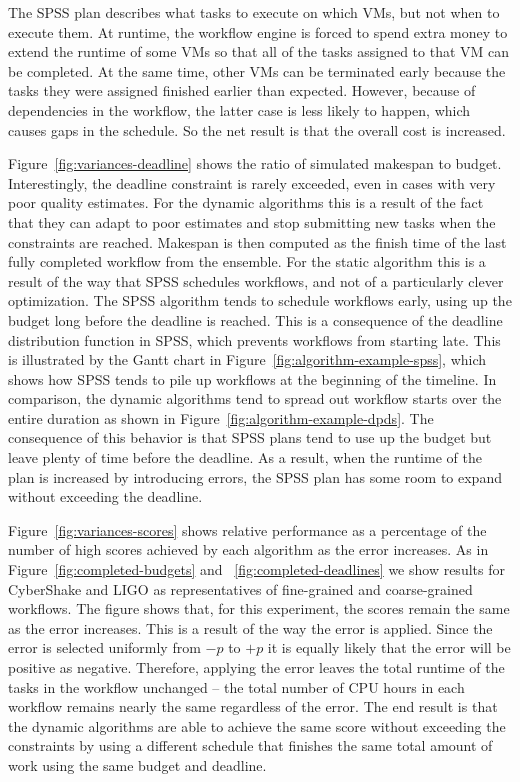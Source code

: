 \documentclass[preprint,5p]{elsarticle}
\begin{document}
The SPSS plan describes what tasks to execute on which VMs, but not when to
execute them. At runtime, the workflow engine is forced to spend extra money
to extend the runtime of some VMs so that all of the tasks assigned to that
VM can be completed. At the same time, other VMs can be terminated early
because the tasks they were assigned finished earlier than expected. However,
because of dependencies in the workflow, the latter case is less likely to
happen, which causes gaps in the schedule. So the net result is that the
overall cost is increased.

Figure~\ref{fig:variances-deadline} shows the ratio of simulated makespan to budget.
Interestingly, the deadline constraint is rarely exceeded, even in cases with
very poor quality estimates. For the dynamic algorithms this is a result of the
fact that they can adapt to poor estimates and stop submitting new tasks when
the constraints are reached. Makespan is then computed as the finish time of the
last fully completed workflow from the ensemble. For the static algorithm this
is a result of the way that SPSS schedules workflows, and not of a particularly
clever optimization. The SPSS algorithm tends to schedule workflows early, using
up the budget long before the deadline is reached. This is a consequence of the
deadline distribution function in SPSS, which prevents workflows from starting
late. This is illustrated by the Gantt chart in
Figure~\ref{fig:algorithm-example-spss}, which shows how SPSS tends to pile up
workflows at the beginning of the timeline.
In comparison, the dynamic algorithms tend to spread out workflow starts over
the entire duration as shown in Figure~\ref{fig:algorithm-example-dpds}. The
consequence of this behavior is that SPSS plans tend to use up the budget but
leave plenty of time before the deadline.
As a result, when the runtime of the plan is increased by introducing errors,
the SPSS plan has some room to expand without exceeding the deadline.


Figure~\ref{fig:variances-scores} shows relative performance as a percentage of
the number of high scores achieved by each algorithm as the error increases. As
in Figure~\ref{fig:completed-budgets} and ~\ref{fig:completed-deadlines} we show
results for CyberShake and LIGO as representatives of fine-grained and
coarse-grained workflows. The figure shows that, for this experiment, the scores remain
the same as the error increases. This is a result of the way the error is
applied. Since the error is selected uniformly from $-p$ to $+p$ it is equally
likely that the error will be positive as negative. Therefore, applying the
error leaves the total runtime of the tasks in the workflow unchanged -- the
total number of CPU hours in each workflow remains nearly the same regardless of
the error. The end result is that the dynamic algorithms are able to achieve the
same score without exceeding the constraints by using a different schedule that
finishes the same total amount of work using the same budget and deadline.
\end{document}
